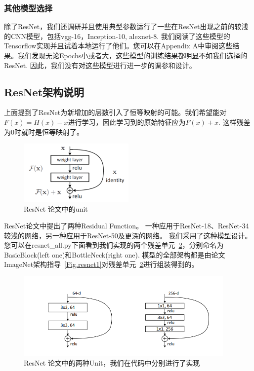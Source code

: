 \documentclass[hyperref, UTF8, 12pt]{article}
\theoremstyle{definition}
\begin{document}
\subsubsection{其他模型选择}
除了ResNet，我们还调研并且使用典型参数运行了一些在ResNet出现之前的较浅的CNN模型，包括vgg-16，Inception-10, alexnet-8. 我们阅读了这些模型的Tensorflow实现并且试着本地运行了他们。您可以在Appendix A中审阅这些结果。我们发现无论Epochs小或者大，这些模型的训练结果都明显不如我们选择的ResNet. 因此，我们没有对这些模型进行进一步的调参和设计。

\subsection{ResNet架构说明}
上面提到了ResNet为新增加的层数引入了恒等映射的可能。我们希望能对$F(x) = H(x) - x$进行学习，因此学习到的原始特征应为$F(x) + x$. 这样残差为0时就时是恒等映射了。\\
\begin{figure}[h] %
	\centering %
	\includegraphics[width=0.5\textwidth]{resnetUnit.png} %
	\caption{ResNet 论文中的unit} %
	\label{Fig.resnet2} %
\end{figure}
\indent
ResNet论文中提出了两种Residual Function。 一种应用于ResNet-18、ResNet-34较浅的网络，另一种应用于ResNet-50及更深的网络。 我们采用了这种模型设计。您可以在resnet\_all.py下面看到我们实现的两个残差单元~\ref{Fig.resnet4}，分别命名为BasicBlock(left one)和BottleNeck(right one). 模型的全部架构都是由论文ImageNet架构指导~\ref{Fig.resnet1}对残差单元~\ref{Fig.resnet4}进行组装得到的。\\
\begin{figure}[h] %
	\centering %
	\includegraphics[width=0.95\textwidth]{resnet2units.png} %
	\caption{ResNet 论文中的两种Unit，我们在代码中分别进行了实现} %
	\label{Fig.resnet4} %
\end{figure}
\end{document}
